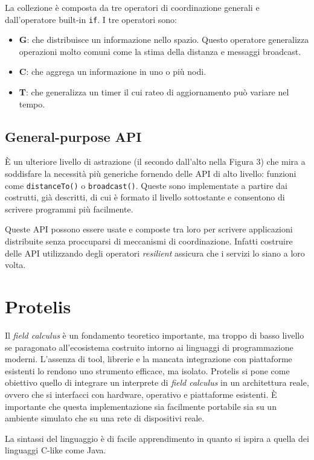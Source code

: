 La collezione è composta da tre operatori di coordinazione generali e
dall'operatore built-in \texttt{if}. I tre operatori sono:
\begin{itemize}
\item \textbf{G}: che distribuisce un informazione nello spazio. Questo
  operatore generalizza operazioni molto comuni come la stima della distanza e
  messaggi broadcast.
\item \textbf{C}: che aggrega un informazione in uno o più nodi.
\item \textbf{T}: che generalizza un timer il cui rateo di aggiornamento può
  variare nel tempo.
\end{itemize}

\subsection{General-purpose API}
È un ulteriore livello di astrazione (il secondo dall'alto nella Figura 3) che
mira a soddisfare la necessità più generiche fornendo delle API di alto livello:
funzioni come \texttt{distanceTo()} o \texttt{broadcast()}. Queste sono
implementate a partire dai costrutti, già descritti, di cui è formato il livello
sottostante e consentono di scrivere programmi più facilmente.

Queste API possono essere usate e composte tra loro per scrivere applicazioni
distribuite senza proccuparsi di meccanismi di coordinazione. Infatti costruire
delle API utilizzando degli operatori \textit{resilient} assicura che i servizi
lo siano a loro volta.

\section{Protelis}
Il \textit{field calculus} è un fondamento teoretico importante, ma troppo di
basso livello se paragonato all'ecosistema costruito intorno ai linguaggi di
programmazione moderni. L'assenza di tool, librerie e la mancata integrazione
con piattaforme esistenti lo rendono uno strumento efficace, ma
isolato. Protelis si pone come obiettivo quello di integrare un interprete di
\textit{field calculus} in un architettura reale, ovvero che si interfacci con
hardware, operativo e piattaforme esistenti. È importante che questa
implementazione sia facilmente portabile sia su un ambiente simulato che su una
rete di dispositivi reale.

La sintassi del linguaggio è di facile apprendimento in quanto si ispira a
quella dei linguaggi C-like come Java.

